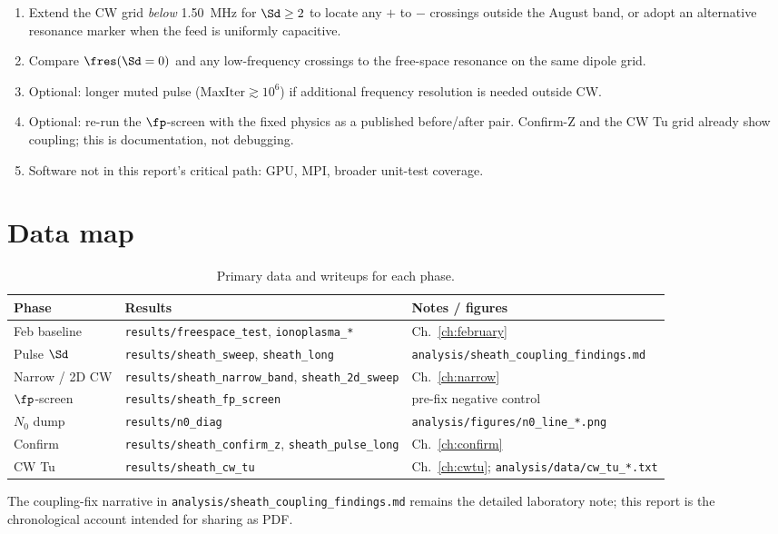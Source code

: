\begin{enumerate}[leftmargin=1.5em]
\item Extend the CW grid \emph{below} 1.50~MHz for \(\Sd\ge 2\) to locate any \(+\) to \(-\) crossings outside the August band, or adopt an alternative resonance marker when the feed is uniformly capacitive.
\item Compare \(\fres(\Sd=0)\) and any low-frequency crossings to the free-space resonance on the same dipole grid.
\item Optional: longer muted pulse (\(\mathrm{MaxIter}\gtrsim 10^{6}\)) if additional frequency resolution is needed outside CW.
\item Optional: re-run the \(\fp\)-screen with the fixed physics as a published before/after pair. Confirm-Z and the CW Tu grid already show coupling; this is documentation, not debugging.
\item Software not in this report's critical path: GPU, MPI, broader unit-test coverage.
\end{enumerate}

\section{Data map}

\begin{table}[ht]
\centering
\caption{Primary data and writeups for each phase.}
\label{tab:datamap}
\begin{tabular}{@{}lll@{}}
\toprule
Phase & Results & Notes / figures \\
\midrule
Feb baseline & \texttt{results/freespace\_test}, \texttt{ionoplasma\_*} & Ch.~\ref{ch:february} \\
Pulse \(\Sd\) & \texttt{results/sheath\_sweep}, \texttt{sheath\_long} & \texttt{analysis/sheath\_coupling\_findings.md} \\
Narrow / 2D CW & \texttt{results/sheath\_narrow\_band}, \texttt{sheath\_2d\_sweep} & Ch.~\ref{ch:narrow} \\
\(\fp\)-screen & \texttt{results/sheath\_fp\_screen} & pre-fix negative control \\
\(N_0\) dump & \texttt{results/n0\_diag} & \texttt{analysis/figures/n0\_line\_*.png} \\
Confirm & \texttt{results/sheath\_confirm\_z}, \texttt{sheath\_pulse\_long} & Ch.~\ref{ch:confirm} \\
CW Tu & \texttt{results/sheath\_cw\_tu} & Ch.~\ref{ch:cwtu}; \texttt{analysis/data/cw\_tu\_*.txt} \\
\bottomrule
\end{tabular}
\end{table}

The coupling-fix narrative in \texttt{analysis/sheath\_coupling\_findings.md} remains the detailed laboratory note; this report is the chronological account intended for sharing as PDF.
